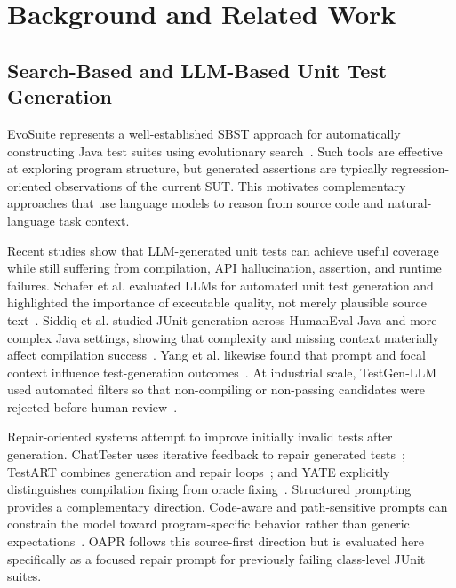 \section{Background and Related Work}
\label{sec:background}

\subsection{Search-Based and LLM-Based Unit Test Generation}
\label{subsec:sbst_llm}
EvoSuite represents a well-established SBST approach for automatically constructing Java test suites using evolutionary search~\cite{fraser2011evosuite}. Such tools are effective at exploring program structure, but generated assertions are typically regression-oriented observations of the current SUT. This motivates complementary approaches that use language models to reason from source code and natural-language task context.

Recent studies show that LLM-generated unit tests can achieve useful coverage while still suffering from compilation, API hallucination, assertion, and runtime failures. Schafer et al. evaluated LLMs for automated unit test generation and highlighted the importance of executable quality, not merely plausible source text~\cite{schafer2024empirical}. Siddiq et al. studied JUnit generation across HumanEval-Java and more complex Java settings, showing that complexity and missing context materially affect compilation success~\cite{siddiq2024junit}. Yang et al. likewise found that prompt and focal context influence test-generation outcomes~\cite{yang2024evaluation}. At industrial scale, TestGen-LLM used automated filters so that non-compiling or non-passing candidates were rejected before human review~\cite{alshahwan2024meta}.

Repair-oriented systems attempt to improve initially invalid tests after generation. ChatTester uses iterative feedback to repair generated tests~\cite{yuan2024chattester}; TestART combines generation and repair loops~\cite{gu2024testart}; and YATE explicitly distinguishes compilation fixing from oracle fixing~\cite{konstantinou2025yate}. Structured prompting provides a complementary direction. Code-aware and path-sensitive prompts can constrain the model toward program-specific behavior rather than generic expectations~\cite{ryan2024codeaware,wang2024hits}. OAPR follows this source-first direction but is evaluated here specifically as a focused repair prompt for previously failing class-level JUnit suites.


